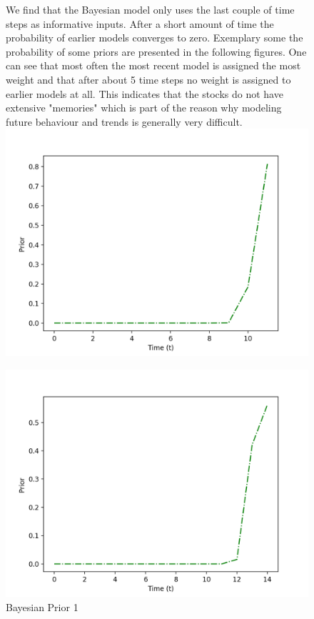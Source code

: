 \begin{figure}[H]
We find that the Bayesian model only uses the last couple of time steps as informative inputs. After a short amount of time the probability of earlier models converges to zero. Exemplary some the probability of some priors are presented in the following figures. One can see that most often the most recent model is assigned the most weight and that after about 5 time steps no weight is assigned to earlier models at all. This indicates that the stocks do not have extensive "memories" which is part of the reason why modeling future behaviour and trends is generally very difficult.
  \includegraphics[width=\linewidth]{Images/Figure_prior.png}
  \caption{Bayesian Prior 1}\label{fig:awesome_image1}
\endminipage\hfill
{}
  \includegraphics[width=\linewidth]{Images/Figure_prior2.png}

\end{figure}
